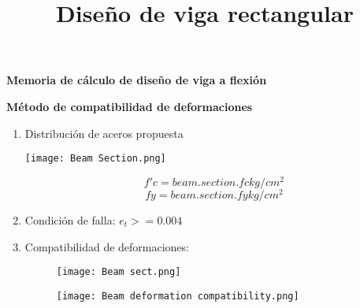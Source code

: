 \documentclass[11pt, a4paper]{report}
\title{Diseño de viga rectangular}
\begin{document}
\begin{center}
\centering 
\textbf{Memoria de cálculo de diseño de viga a flexión}
\vspace{0.3cm}

\textbf{Método de compatibilidad de deformaciones}
\vspace{0.2cm}
\end{center}

\begin{enumerate}  
    \item Distribución de aceros propuesta
    \begin{center}
    \begin{minipage}{8.2cm} 
        \centering 
        \setlength\fboxsep{0pt}
        \setlength\fboxrule{0.3pt}

        \texttt{[image: Beam Section.png]}
    \end{minipage}
    \end{center}

    \[f'c = {{beam.section.fc}}kg/cm^2\]
    \[fy = {{beam.section.fy}}kg/cm^2\]
    
    \item Condición de falla: $e_t>=0.004$
    \item Compatibilidad de deformaciones:
    
    \begin{figure}[h]  %
        \begin{multicols}{2}
            \begin{minipage}[c]{6.5cm}
                \centering
                \setlength\fboxsep{0pt}
                \setlength\fboxrule{0.3pt}
                \texttt{[image: Beam sect.png]}
            \end{minipage}
            \captionsetup{justification=centering}

            \begin{minipage}[c]{6.5cm}
                \centering
                \setlength\fboxsep{0pt}
                \setlength\fboxrule{0.3pt}
                \texttt{[image: Beam deformation compatibility.png]}
            \end{minipage}
            \captionsetup{justification=centering}
        \end{multicols}
    \end{figure}


\end{enumerate}
\end{document}
